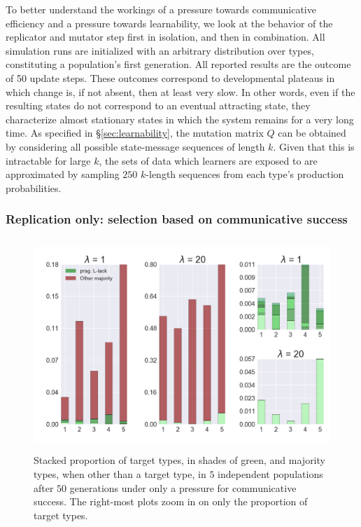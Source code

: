\documentclass[a4paper, 11pt]{article}
\theoremstyle{Satz}
\begin{document}
To better understand the workings of a pressure towards communicative efficiency and a pressure
towards learnability, we look at the behavior of the replicator and mutator step first in
isolation, and then in combination. All simulation runs are initialized with an arbitrary
distribution over types, constituting a population's first generation. All reported results are
the outcome of 50 update steps. These outcomes correspond to developmental plateaus in which
change is, if not absent, then at least very slow. In other words, even if the resulting states
do not correspond to an eventual attracting state, they characterize almost stationary states
in which the system remains for a very long time. As specified in \S\ref{sec:learnability}, the
mutation matrix $Q$ can be obtained by considering all possible state-message sequences of
length $k$. Given that this is intractable for large $k$, the sets of data which learners are
exposed to are approximated by sampling $250$ $k$-length sequences from each type's production
probabilities.


\subsubsection{Replication only: selection based on communicative success} 


\begin{figure}[t]
\centering
\includegraphics[width=\textwidth,height=8cm, keepaspectratio]{./plots/fig1-onlyr}
\caption{Stacked proportion of target types, in shades of green, and majority types, when other
  than a target type, in $5$ independent populations after $50$ generations under only a
  pressure for communicative success. The right-most plots zoom in on only the proportion of
  target types.}
\label{fig:only-R}
\end{figure}
\end{document}
